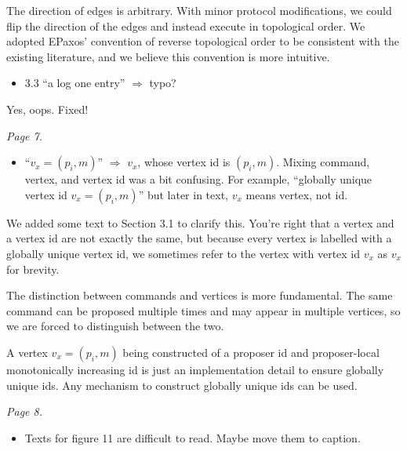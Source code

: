 \documentclass[letterpaper,twocolumn,10pt]{article}
\newenvironment{reviewerquote}
{\list{}{\leftmargin=\parindent\rightmargin=0in}\item[] \itshape \color{ReviewerDarkGray}}%
{\endlist}
\begin{document}
The direction of edges is arbitrary. With minor protocol modifications, we
could flip the direction of the edges and instead execute in topological order.
We adopted EPaxos' convention of reverse topological order to be consistent
with the existing literature, and we believe this convention is more intuitive.

\begin{reviewerquote}
  \begin{itemize}
    \item
      3.3 ``a log one entry'' $\Rightarrow$ typo?
  \end{itemize}
\end{reviewerquote}

Yes, oops. Fixed!

\begin{reviewerquote}
  Page 7.

  \begin{itemize}
    \item
      ``$v_x = (p_i, m)$'' $\Rightarrow$ $v_x$, whose vertex id is $(p_i, m)$.
      Mixing command, vertex, and vertex id was a bit confusing. For example,
      ``globally unique vertex id $v_x = (p_i, m)$'' but later in text, $v_x$
      means vertex, not id.
  \end{itemize}
\end{reviewerquote}

We added some text to Section 3.1 to clarify this. You're right that a vertex
and a vertex id are not exactly the same, but because every vertex is labelled
with a globally unique vertex id, we sometimes refer to the vertex with vertex
id $v_x$ as $v_x$ for brevity.

The distinction between commands and vertices is more fundamental. The same
command can be proposed multiple times and may appear in multiple vertices, so
we are forced to distinguish between the two.

A vertex $v_x = (p_i, m)$ being constructed of a proposer id and proposer-local
monotonically increasing id is just an implementation detail to ensure globally
unique ids. Any mechanism to construct globally unique ids can be used.

\begin{reviewerquote}
  Page 8.

  \begin{itemize}
    \item
      Texts for figure 11 are difficult to read. Maybe move them to caption.
  \end{itemize}
\end{reviewerquote}
\end{document}
